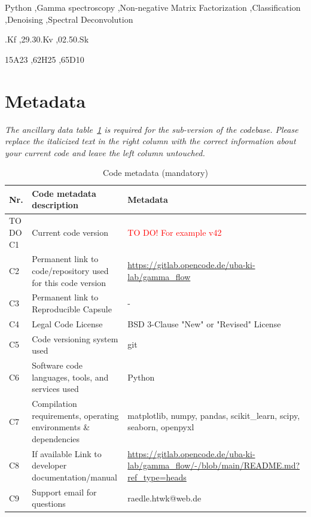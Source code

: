 \documentclass[preprint,12pt, a4paper]{elsarticle}
\begin{document}
\begin{frontmatter}
\begin{keyword}
Python \sep Gamma spectroscopy \sep Non-negative Matrix Factorization \sep Classification \sep Denoising \sep Spectral Deconvolution

.Kf %
\sep 29.30.Kv %
\sep 02.50.Sk %

\MSC[2020] 15A23 %
\sep 62H25 %
\sep 65D10 %

\end{keyword}

\end{frontmatter}


\section*{Metadata}
\label{}
\textit{The ancillary data table~\ref{codeMetadata} is required for the sub-version of the codebase. Please replace the italicized text in the right column with the correct information about your current code and leave the left column untouched.}

\begin{table}[!h]
\begin{tabular}{|l|p{6.5cm}|p{6.5cm}|}
\hline
\textbf{Nr.} & \textbf{Code metadata description} & \textbf{Metadata} \\
\hline
TO DO C1 & Current code version & \textcolor{red}{TO DO! For example v42} \\
\hline
C2 & Permanent link to code/repository used for this code version & \url{https://gitlab.opencode.de/uba-ki-lab/gamma_flow} \\
\hline
C3  & Permanent link to Reproducible Capsule & - \\
\hline
C4 & Legal Code License & BSD 3-Clause "New" or "Revised" License \\
\hline
C5 & Code versioning system used & git\\
\hline
C6 & Software code languages, tools, and services used & Python \\
\hline
C7 & Compilation requirements, operating environments \& dependencies & matplotlib, numpy, pandas, scikit\_learn, scipy, seaborn, openpyxl \\
\hline
C8 & If available Link to developer documentation/manual & \url{https://gitlab.opencode.de/uba-ki-lab/gamma_flow/-/blob/main/README.md?ref_type=heads} \\
\hline
C9 & Support email for questions & raedle.htwk@web.de\\
\hline
\end{tabular}
\caption{Code metadata (mandatory)}
\label{codeMetadata} 
\end{table}
\end{document}
